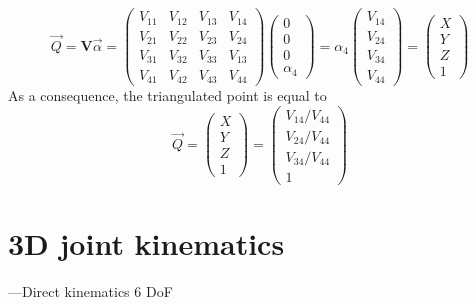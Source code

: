 \begin{algorithm}
\begin{algorithmic}[1]
\begin{equation}
          \overrightarrow{Q} = 
          \textbf{V} \overrightarrow{\alpha} 
          = \begin{pmatrix}V_{11} & V_{12} & V_{13} & V_{14} \\
          V_{21} & V_{22} & V_{23} & V_{24} \\
          V_{31} & V_{32} & V_{33} & V_{13} \\
          V_{41} & V_{42} & V_{43} & V_{44}\end{pmatrix} \begin{pmatrix}0 \\0 \\0 \\\alpha_4\end{pmatrix} 
          = \alpha_4 \begin{pmatrix}V_{14} \\V_{24} \\V_{34} \\V_{44}\end{pmatrix} 
          = \begin{pmatrix}X \\Y \\Z \\1\end{pmatrix}
      \end{equation} 
      \STATE As a consequence, the triangulated point is equal to
      \begin{equation}
          \overrightarrow{Q}=\begin{pmatrix}X \\Y \\Z \\1\end{pmatrix} = \begin{pmatrix}V_{14}/V_{44} \\V_{24}/V_{44} \\V_{34}/V_{44} \\1\end{pmatrix}
      \end{equation}
      \end{algorithmic}
\end{algorithm}




\section{3D joint kinematics}\label{sec:3D joint kin}


---Direct kinematics
6 DoF 

